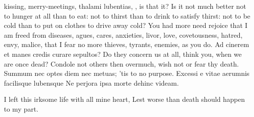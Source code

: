 {kissing, merry-meetings, thalami lubentias, \etc{}, is that it? Is it not
much better not to hunger at all than to eat: not to thirst than to
drink to satisfy thirst: not to be cold than to put on clothes to drive
away cold? You had more need rejoice that I am freed from diseases,
agues, cares, anxieties, livor, love, covetousness, hatred, envy,
malice, that I fear no more thieves, tyrants, enemies, as you do.
Ad cinerem et manes credis curare sepultos? Do they concern us at
all, think you, when we are once dead? Condole not others then
overmuch, wish not or fear thy death.  Summum nec optes diem nec
metuas; 'tis to no purpose.
Excessi e vitae aerumnis facilisque lubensque
Ne perjora ipsa morte dehinc videam.

I left this irksome life with all mine heart,
Lest worse than death should happen to my part.

}
